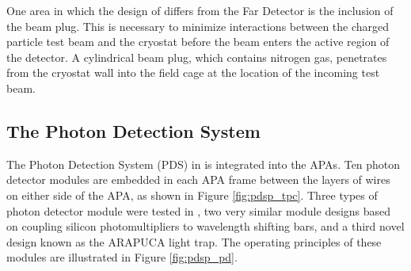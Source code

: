 One area in which the design of \protodune{} differs from the Far Detector is
the inclusion of the beam plug. This is necessary to minimize interactions
between the charged particle test beam and the cryostat before the beam enters 
the active region of the detector. A cylindrical beam plug, which contains 
nitrogen gas, penetrates from the cryostat wall into the field cage at 
the location of the incoming test beam. 

\subsection{The Photon Detection System}

The Photon Detection System (PDS) in \protodune{} is integrated into the APAs. 
Ten photon detector modules are embedded in each APA frame between the layers 
of wires on either side of the APA, as shown in Figure \ref{fig:pdsp_tpc}. 
Three types of photon detector module were tested in \protodune{}, two very 
similar module designs based on coupling silicon photomultipliers to 
wavelength shifting bars, and a third novel design known as the ARAPUCA light 
trap. The operating principles of these modules are illustrated in Figure 
\ref{fig:pdsp_pd}.

